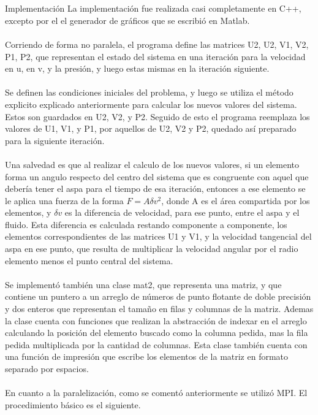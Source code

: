
~\\
~\\

\begin{section}{Implementación}
La implementación fue realizada casi completamente en C++, excepto por el el generador de gráficos que se escribió en Matlab. 
~\\
~\\
Corriendo de forma no paralela, el programa define las matrices U2, U2, V1, V2, P1, P2, que representan el estado del sistema en una iteración para la velocidad en u, en v, y la presión, y luego estas mismas en la iteración siguiente. 
~\\
~\\
Se definen las condiciones iniciales del problema, y luego se utiliza el método explicito explicado anteriormente para calcular los nuevos valores del sistema. Estos son guardados en U2, V2, y P2. Seguido de esto el programa reemplaza los valores de U1, V1, y P1, por aquellos de U2, V2 y P2, quedado así preparado para la siguiente iteración. 
~\\
~\\
Una salvedad es que al realizar el calculo de los nuevos valores, si un elemento forma un angulo respecto del centro del sistema que es congruente con aquel que debería tener el aspa para el tiempo de esa iteración, entonces a ese elemento se le aplica una fuerza de la forma $F = A \delta v^2$, donde A es el área compartida por los elementos, y $\delta v$ es la diferencia de velocidad, para ese punto, entre el aspa y el fluido. Esta diferencia es calculada restando componente a componente, los elementos correspondientes de las matrices U1 y V1, y la velocidad tangencial del aspa en ese punto, que resulta de multiplicar la velocidad angular por el radio elemento menos el punto central del sistema. 
~\\
~\\
Se implementó también una clase mat2, que representa una matriz, y que contiene un puntero a un arreglo de números de punto flotante de doble precisión y dos enteros que representan el tamaño en filas y columnas de la matriz. Ademas la clase cuenta con funciones que realizan la abstracción de indexar en el arreglo calculando la posición del elemento buscado como la columna pedida, mas la fila pedida multiplicada por la cantidad de columnas. Esta clase también cuenta con una función de impresión que escribe los elementos de la matriz en formato separado por espacios.
~\\
~\\
En cuanto a la paralelización, como se comentó anteriormente se utilizó MPI. El procedimiento básico es el siguiente.
\begin{itemize}


\end{itemize}
\end{section}
